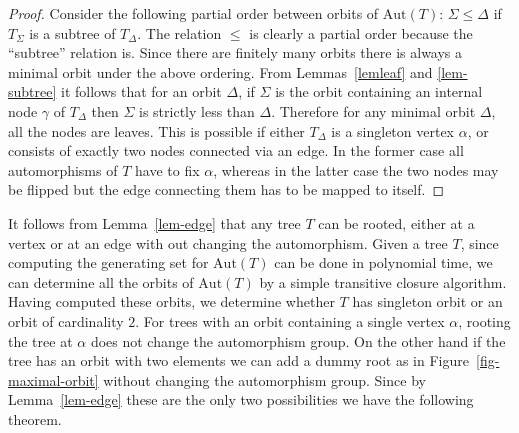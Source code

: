 \documentclass[a4paper,11pt]{article}
\newcommand{\Aut}[1]{\ensuremath{\mathrm{Aut}\left(#1\right)}}
\begin{document}

\begin{proof}
  Consider the following partial order between orbits of $\Aut{T}$:
  $\Sigma \leq \Delta$ if $T_\Sigma$ is a subtree of $T_\Delta$. The
  relation $\leq$ is clearly a partial order because the ``subtree''
  relation is.  Since there are finitely many orbits there is always a
  minimal orbit under the above ordering.  From Lemmas~\ref{lemleaf}
  and \ref{lem-subtree} it follows that for an orbit $\Delta$, if
  $\Sigma$ is the orbit containing an internal node $\gamma$ of
  $T_\Delta$ then $\Sigma$ is strictly less than $\Delta$. Therefore
  for any minimal orbit $\Delta$, all the nodes are leaves. This is
  possible if either $T_\Delta$ is a singleton vertex $\alpha$, or
  consists of exactly two nodes connected via an edge. In the former
  case all automorphisms of $T$ have to fix $\alpha$, whereas in the
  latter case the two nodes may be flipped but the edge connecting
  them has to be mapped to itself.
\end{proof}

It follows from Lemma~\ref{lem-edge} that any tree $T$ can be rooted,
either at a vertex or at an edge with out changing the automorphism.
Given a tree $T$, since computing the generating set for $\Aut{T}$ can
be done in polynomial time, we can determine all the orbits of
$\Aut{T}$ by a simple transitive closure algorithm. Having computed
these orbits, we determine whether $T$ has singleton orbit or an orbit
of cardinality $2$. For trees with an orbit containing a single vertex
$\alpha$, rooting the tree at $\alpha$ does not change the
automorphism group. On the other hand if the tree has an orbit with
two elements we can add a dummy root as in
Figure~\ref{fig-maximal-orbit} without changing the automorphism
group. Since by Lemma~\ref{lem-edge} these are the only two
possibilities we have the following theorem.
\end{document}
